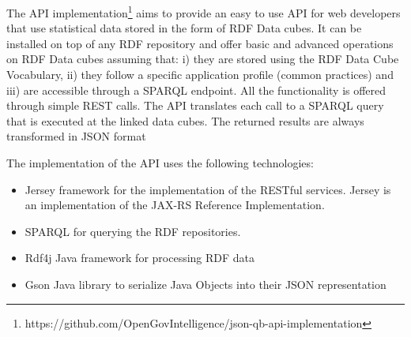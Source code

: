 \documentclass{llncs}
\begin{document}
The API implementation\footnote{https://github.com/OpenGovIntelligence/json-qb-api-implementation} aims to provide an easy to use API for web developers that use statistical data stored in the form of RDF Data cubes. It  can be installed on top of any RDF repository and offer basic and advanced operations on RDF Data cubes assuming that: i) they are stored using the RDF Data Cube Vocabulary, ii) they follow a specific application profile (common practices) and iii) are accessible through a SPARQL endpoint.  All the functionality is offered through simple REST calls. The API translates each call to a SPARQL query that is executed at the linked data cubes. The returned results are always transformed  in JSON format 

The implementation of the API uses the following technologies:
\begin{itemize}
\item Jersey  framework for the implementation of the RESTful services. Jersey is an implementation of the JAX-RS  Reference Implementation. 
\item SPARQL  for querying the RDF repositories. 
\item Rdf4j  Java framework for processing RDF data 
\item Gson  Java library to serialize Java Objects into their JSON representation  
\end{itemize}
\end{document}
